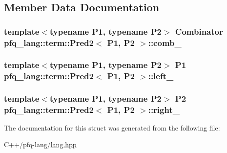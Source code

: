 \subsection{Member Data Documentation}
\hypertarget{structpfq__lang_1_1term_1_1Pred2_a6b0db7f4e7c69fef8112e5b9a65e2af9}{
\subsubsection[{comb\+\_\+}]{\setlength{\rightskip}{0pt plus 5cm}template$<$typename P1, typename P2$>$ {\bf Combinator} {\bf pfq\+\_\+lang\+::term\+::\+Pred2}$<$ P1, P2 $>$\+::comb\+\_\+}}\label{structpfq__lang_1_1term_1_1Pred2_a6b0db7f4e7c69fef8112e5b9a65e2af9}
\hypertarget{structpfq__lang_1_1term_1_1Pred2_accc6c58f733abc7027ffde56148dd91e}{
\subsubsection[{left\+\_\+}]{\setlength{\rightskip}{0pt plus 5cm}template$<$typename P1, typename P2$>$ P1 {\bf pfq\+\_\+lang\+::term\+::\+Pred2}$<$ P1, P2 $>$\+::left\+\_\+}}\label{structpfq__lang_1_1term_1_1Pred2_accc6c58f733abc7027ffde56148dd91e}
\hypertarget{structpfq__lang_1_1term_1_1Pred2_a0bc158e2c177545dcc9199caab6a4d12}{
\subsubsection[{right\+\_\+}]{\setlength{\rightskip}{0pt plus 5cm}template$<$typename P1, typename P2$>$ P2 {\bf pfq\+\_\+lang\+::term\+::\+Pred2}$<$ P1, P2 $>$\+::right\+\_\+}}\label{structpfq__lang_1_1term_1_1Pred2_a0bc158e2c177545dcc9199caab6a4d12}


The documentation for this struct was generated from the following file\+:\begin{DoxyCompactItemize}
\item 
C++/pfq-\/lang/\hyperlink{lang_8hpp}{lang.\+hpp}\end{DoxyCompactItemize}
